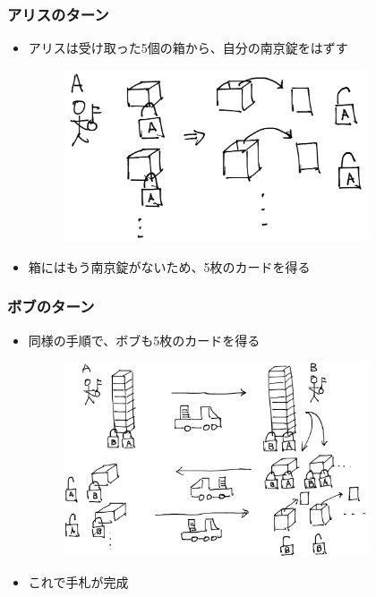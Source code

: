 
\begin{frame}
  \frametitle{\showIndex アリスのターン}

  \begin{itemize}
    \item<+-> アリスは受け取った5個の箱から、自分の南京錠をはずす
    \begin{figure}[h]
      \includegraphics[width=0.85\textwidth]{img/unlock_a.png}
    \end{figure}

    \item<+-> 箱にはもう南京錠がないため、5枚のカードを得る
  \end{itemize}
\end{frame}


\begin{frame}
  \frametitle{\showIndex ボブのターン}

  \begin{itemize}
    \item<+-> 同様の手順で、ボブも5枚のカードを得る
    \begin{figure}[h]
      \includegraphics[width=0.85\textwidth]{img/turn_b.png}
    \end{figure}

    \item<+-> これで手札が完成
  \end{itemize}
\end{frame}

